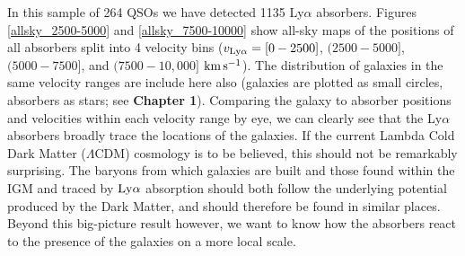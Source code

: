 \documentclass[twocolumn,tighten]{aastex62}
\newcommand{\kms}{$\rm km\, s^{-1}$}
\begin{document}
In this sample of 264 QSOs we have detected 1135 Ly$\alpha$ absorbers. Figures \ref{allsky_2500-5000} and \ref{allsky_7500-10000} show all-sky maps of the positions of all absorbers split into 4 velocity bins ($v_{\rm Ly\alpha} = [0 - 2500]$, $(2500 - 5000]$, $(5000 - 7500]$, and $(7500 - 10,000]$ \kms). The distribution of galaxies in the same velocity ranges are include here also (galaxies are plotted as small circles, absorbers as stars; see \textbf{Chapter 1}). Comparing the galaxy to absorber positions and velocities within each velocity range by eye, we can clearly see that the Ly$\alpha$ absorbers broadly trace the locations of the galaxies. If the current Lambda Cold Dark Matter ($\Lambda$CDM) cosmology is to be believed, this should not be remarkably surprising. The baryons from which galaxies are built and those found within the IGM and traced by $\rm Ly\alpha$ absorption should both follow the underlying potential produced by the Dark Matter, and should therefore be found in similar places. Beyond this big-picture result however, we want to know how the absorbers react to the presence of the galaxies on a more local scale.
\end{document}
